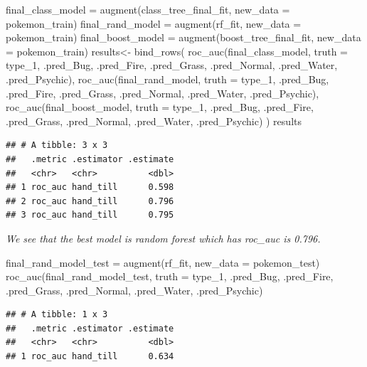 \documentclass[
]{article}
\newenvironment{Shaded}{\begin{snugshade}}{\end{snugshade}}
\newcommand{\AttributeTok}[1]{\textcolor[rgb]{0.77,0.63,0.00}{#1}}
\newcommand{\FunctionTok}[1]{\textcolor[rgb]{0.00,0.00,0.00}{#1}}
\newcommand{\NormalTok}[1]{#1}
\newcommand{\OtherTok}[1]{\textcolor[rgb]{0.56,0.35,0.01}{#1}}
\begin{document}
\begin{Shaded}
\begin{Highlighting}[]
\NormalTok{final\_class\_model }\OtherTok{=} \FunctionTok{augment}\NormalTok{(class\_tree\_final\_fit, }\AttributeTok{new\_data =}\NormalTok{ pokemon\_train)}
\NormalTok{final\_rand\_model }\OtherTok{=} \FunctionTok{augment}\NormalTok{(rf\_fit, }\AttributeTok{new\_data =}\NormalTok{ pokemon\_train)}
\NormalTok{final\_boost\_model }\OtherTok{=} \FunctionTok{augment}\NormalTok{(boost\_tree\_final\_fit, }\AttributeTok{new\_data =}\NormalTok{ pokemon\_train)}
\NormalTok{results}\OtherTok{\textless{}{-}} \FunctionTok{bind\_rows}\NormalTok{(}
  \FunctionTok{roc\_auc}\NormalTok{(final\_class\_model, }\AttributeTok{truth =}\NormalTok{ type\_1, .pred\_Bug, .pred\_Fire, .pred\_Grass, }
\NormalTok{          .pred\_Normal, .pred\_Water, .pred\_Psychic),}
  \FunctionTok{roc\_auc}\NormalTok{(final\_rand\_model, }\AttributeTok{truth =}\NormalTok{ type\_1, .pred\_Bug, .pred\_Fire, .pred\_Grass, }
\NormalTok{          .pred\_Normal, .pred\_Water, .pred\_Psychic),}
  \FunctionTok{roc\_auc}\NormalTok{(final\_boost\_model, }\AttributeTok{truth =}\NormalTok{ type\_1, .pred\_Bug, .pred\_Fire, .pred\_Grass, }
\NormalTok{          .pred\_Normal, .pred\_Water, .pred\_Psychic) }
\NormalTok{)}
\NormalTok{results}
\end{Highlighting}
\end{Shaded}

\begin{verbatim}
## # A tibble: 3 x 3
##   .metric .estimator .estimate
##   <chr>   <chr>          <dbl>
## 1 roc_auc hand_till      0.598
## 2 roc_auc hand_till      0.796
## 3 roc_auc hand_till      0.795
\end{verbatim}

\emph{We see that the best model is random forest which has roc\_auc is
0.796.}

\begin{Shaded}
\begin{Highlighting}[]
\NormalTok{final\_rand\_model\_test }\OtherTok{=} \FunctionTok{augment}\NormalTok{(rf\_fit, }\AttributeTok{new\_data =}\NormalTok{ pokemon\_test)}
\FunctionTok{roc\_auc}\NormalTok{(final\_rand\_model\_test, }\AttributeTok{truth =}\NormalTok{ type\_1, .pred\_Bug, .pred\_Fire, .pred\_Grass, .pred\_Normal, .pred\_Water, .pred\_Psychic)}
\end{Highlighting}
\end{Shaded}

\begin{verbatim}
## # A tibble: 1 x 3
##   .metric .estimator .estimate
##   <chr>   <chr>          <dbl>
## 1 roc_auc hand_till      0.634
\end{verbatim}
\end{document}
